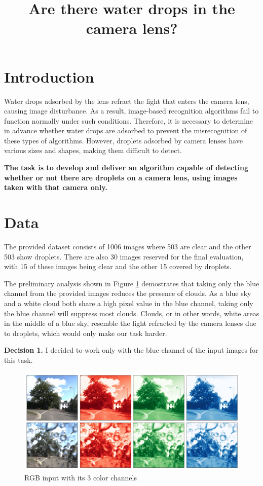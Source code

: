 \documentclass[conference]{IEEEtran}
\begin{document}
\title{Are there water drops in the camera lens?}
\author{}

\maketitle

\section{Introduction}

Water drops adsorbed by the lens refract the light that enters the camera lens, causing image disturbance. As a result, image-based recognition algorithms fail to function normally under such conditions. Therefore, it is necessary to determine in advance whether water drops are adsorbed to prevent the misrecognition of these types of algorithms. However, droplets adsorbed by camera lenses have various sizes and shapes, making them difficult to detect.

\textbf{The task is to develop and deliver an algorithm capable of detecting whether or not there are droplets on a camera lens, using images taken with that camera only.}

\section{Data}

The provided dataset consists of 1006 images where 503 are clear and the other 503 show droplets. There are also 30 images reserved for the final evaluation, with 15 of these images being clear and the other 15 covered by droplets.

\phantom{a}

The preliminary analysis shown in Figure \ref{fig:channels} demostrates that taking only the blue channel from the provided images reduces the presence of clouds. As a blue sky and a white cloud both share a high pixel value in the blue channel, taking only the blue channel will suppress most clouds. Clouds, or in other words, white areas in the middle of a blue sky, resemble the light refracted by the camera lenses due to droplets, which would only make our task harder.

\textbf{Decision 1.} I decided to work only with the blue channel of the input images for this task.


\begin{figure}[h!]
\centering
\includegraphics[width=\linewidth]{images/channels.png}
\caption{RGB input with its 3 color channels}
\label{fig:channels}
\end{figure}
\end{document}
